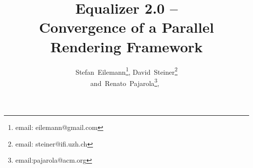 \documentclass[10pt,journal,compsoc]{IEEEtran}
\begin{document}
%
\title{Equalizer 2.0 --\\Convergence of a Parallel Rendering Framework}
%
%
%
%

\author{Stefan~Eilemann\thanks{email: eilemann@gmail.com},
        David~Steiner\thanks{email: steiner@ifi.uzh.ch} \\ %
        and~Renato~Pajarola\thanks{email:pajarola@acm.org},~%
}


\end{document}
